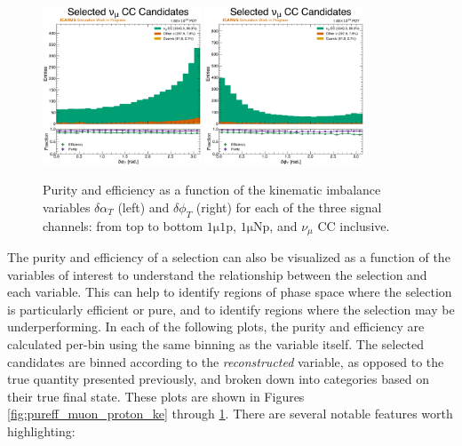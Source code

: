 \begin{figure}[!htb]
    \\
    \includegraphics[width=0.42\textwidth]{figures/neutrino_selection/selected_hist1d_1muX_delta_alphaT.pdf}
    \includegraphics[width=0.42\textwidth]{figures/neutrino_selection/selected_hist1d_1muX_delta_phiT.pdf}
    \caption{Purity and efficiency as a function of the kinematic imbalance variables $\delta \alpha_T$ (left) and $\delta \phi_T$ (right) for each of the three signal channels: from top to bottom $\mathrm{1\mu 1p}$, $\mathrm{1\mu Np}$, and $\nu_\mu$ CC inclusive.}
    \label{fig:pureff_kinematic_imbalance_angles}
\end{figure}

The purity and efficiency of a selection can also be visualized as a function of the variables of interest to understand the relationship between the selection and each variable. This can help to identify regions of phase space where the selection is particularly efficient or pure, and to identify regions where the selection may be underperforming. In each of the following plots, the purity and efficiency are calculated per-bin using the same binning as the variable itself. The selected candidates are binned according to the \textit{reconstructed} variable, as opposed to the true quantity presented previously, and broken down into categories based on their true final state. These plots are shown in Figures \ref{fig:pureff_muon_proton_ke} through \ref{fig:pureff_kinematic_imbalance_angles}. There are several notable features worth highlighting:

